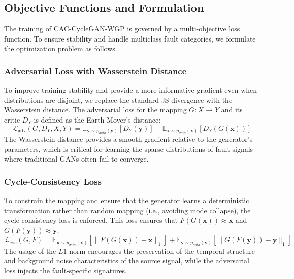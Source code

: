 \subsection{Objective Functions and Formulation}
The training of CAC-CycleGAN-WGP is governed by a multi-objective loss function. To ensure stability and handle multiclass fault categories, we formulate the optimization problem as follows.

\subsubsection{Adversarial Loss with Wasserstein Distance}
To improve training stability and provide a more informative gradient even when distributions are disjoint, we replace the standard JS-divergence with the Wasserstein distance. The adversarial loss for the mapping $G: X \to Y$ and its critic $D_Y$ is defined as the Earth Mover's distance:
\begin{equation}
\mathcal{L}_{\text{adv}}(G, D_Y, X, Y) = \mathbb{E}_{\boldsymbol{y} \sim p_{data}(\boldsymbol{y})}[D_Y(\boldsymbol{y})] - \mathbb{E}_{\boldsymbol{x} \sim p_{data}(\boldsymbol{x})}[D_Y(G(\boldsymbol{x}))]
\end{equation}
The Wasserstein distance provides a smooth gradient relative to the generator's parameters, which is critical for learning the sparse distributions of fault signals where traditional GANs often fail to converge.

\subsubsection{Cycle-Consistency Loss}
To constrain the mapping and ensure that the generator learns a deterministic transformation rather than random mapping (i.e., avoiding mode collapse), the cycle-consistency loss is enforced. This loss ensures that $F(G(\boldsymbol{x})) \approx \boldsymbol{x}$ and $G(F(\boldsymbol{y})) \approx \boldsymbol{y}$:
\begin{equation}
\mathcal{L}_{\text{cyc}}(G, F) = \mathbb{E}_{\boldsymbol{x} \sim p_{data}(\boldsymbol{x})} [\|F(G(\boldsymbol{x})) - \boldsymbol{x}\|_1] + \mathbb{E}_{\boldsymbol{y} \sim p_{data}(\boldsymbol{y})} [\|G(F(\boldsymbol{y})) - \boldsymbol{y}\|_1]
\end{equation}
The usage of the $L1$ norm encourages the preservation of the temporal structure and background noise characteristics of the source signal, while the adversarial loss injects the fault-specific signatures.

